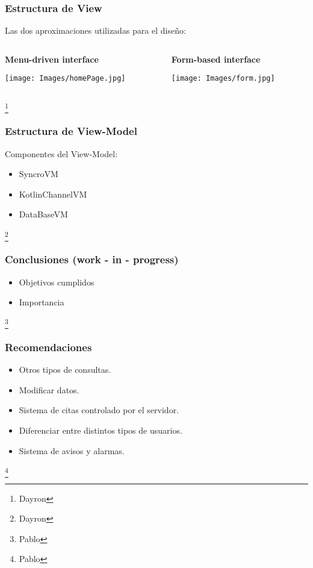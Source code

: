 \documentclass[14pt]{beamer}
\begin{document}
\begin{frame}
\frametitle{Estructura de View}
Las dos aproximaciones utilizadas para el diseño:

\begin{columns}
\begin{column}{0.5\textwidth}
\textbf{Menu-driven interface}
\begin{center}

\texttt{[image: Images/homePage.jpg]}

\end{center}
\end{column}
\begin{column}{0.5\textwidth}
\textbf{Form-based interface}
\begin{center}

\texttt{[image: Images/form.jpg]}

\end{center}
\end{column}
\end{columns}
\footnote{Dayron}
\end{frame}


\begin{frame}
\frametitle{Estructura de View-Model}
Componentes del View-Model:
\begin{itemize}
\item SyncroVM
\item KotlinChannelVM
\item DataBaseVM


\end{itemize}



\footnote{Dayron}
\end{frame}

\begin{frame}
\frametitle{Conclusiones (work - in - progress)}
\begin{itemize}
\item Objetivos cumplidos

\item Importancia
\end{itemize}
\footnote{Pablo}
\end{frame}


\begin{frame}
\frametitle{Recomendaciones}

\begin{itemize}
\item Otros tipos de consultas.
\item Modificar datos.
\item Sistema de citas controlado por el servidor.
\item Diferenciar entre distintos tipos de usuarios.
\item Sistema de avisos y alarmas.
\end{itemize}

\footnote{Pablo}
\end{frame}





\begin{frame}
\maketitle
\end{frame}
\end{document}
